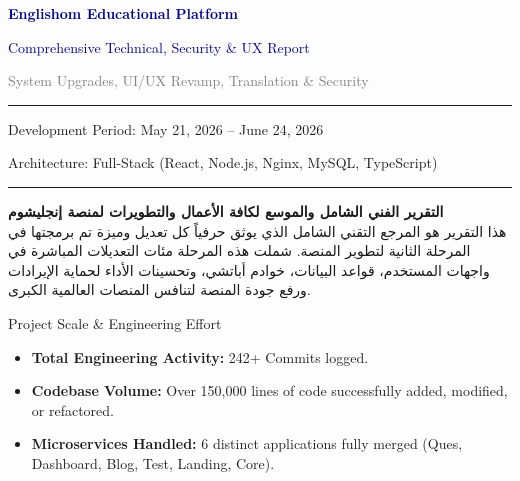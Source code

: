 \documentclass[11pt,a4paper]{article}
\begin{document}
\begin{titlepage}
\centering\vspace*{2cm}
{\Huge\bfseries\textcolor{darkblue}{Englishom Educational Platform}\par}\vspace{0.5cm}
{\LARGE\textcolor{darkblue}{Comprehensive Technical, Security \& UX Report}\par}\vspace{0.3cm}
{\Large\textcolor{gray}{System Upgrades, UI/UX Revamp, Translation \& Security}\par}\vspace{1.5cm}
\rule{\textwidth}{2pt}\vspace{0.5cm}
{\large Development Period: May 21, 2026 -- June 24, 2026\par}\vspace{0.3cm}
{\large Architecture: Full-Stack (React, Node.js, Nginx, MySQL, TypeScript)\par}\vspace{0.5cm}
\rule{\textwidth}{2pt}
\vspace{1.5cm}

\begin{arabicbox}
\begin{center}
\textbf{\Large \textarabic{التقرير الفني الشامل والموسع لكافة الأعمال والتطويرات لمنصة إنجليشوم}}\\[10pt]
\textarabic{هذا التقرير هو المرجع التقني الشامل الذي يوثق حرفياً كل تعديل وميزة تم برمجتها في المرحلة الثانية لتطوير المنصة. شملت هذه المرحلة مئات التعديلات المباشرة في واجهات المستخدم، قواعد البيانات، خوادم أباتشي، وتحسينات الأداء لحماية الإيرادات ورفع جودة المنصة لتنافس المنصات العالمية الكبرى.}
\end{center}
\end{arabicbox}

\vspace{1cm}
\begin{topicbox}{Project Scale \& Engineering Effort}
\begin{itemize}[leftmargin=*]
    \item \textbf{Total Engineering Activity:} 242+ Commits logged.
    \item \textbf{Codebase Volume:} Over 150,000 lines of code successfully added, modified, or refactored.
    \item \textbf{Microservices Handled:} 6 distinct applications fully merged (Ques, Dashboard, Blog, Test, Landing, Core).
\end{itemize}
\end{topicbox}

\end{titlepage}
\end{document}
